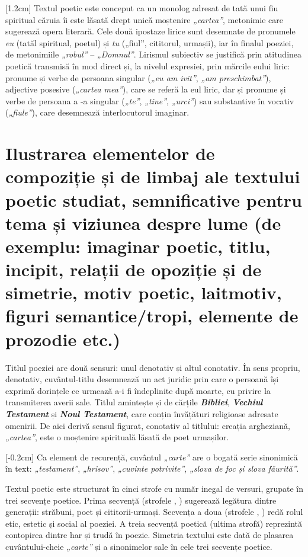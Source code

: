 [1.2cm]
Textul poetic este conceput ca un monolog adresat de tată unui fiu spiritual căruia îi este lăsată drept unică moștenire \textit{„cartea”}, metonimie care sugerează opera literară. Cele două ipostaze lirice sunt desemnate de pronumele \textit{eu} (tatăl spiritual, poetul) și \textit{tu} („fiul”, cititorul, urmașii), iar în finalul poeziei, de metonimiile \textit{„robul”} -- \textit{„Domnul”}. Lirismul subiectiv se justifică prin atitudinea poetică transmisă în mod direct și, la nivelul expresiei, prin mărcile eului liric: pronume și verbe de persoana  singular (\textit{„eu am ivit”}, \textit{„am preschimbat”}), adjective posesive (\textit{„cartea mea”}), care se referă la eul liric, dar și pronume și verbe de persoana a -a singular (\textit{„te”}, \textit{„tine”}, \textit{„urci”}) sau substantive în vocativ (\textit{„fiule”}), care desemnează interlocutorul imaginar.


\section{Ilustrarea elementelor de compoziție și de limbaj ale textului poetic studiat, semnificative pentru tema și viziunea despre lume {\footnotesize\normalfont(de exemplu: imaginar poetic, titlu, incipit, relații de opoziție și de simetrie, motiv poetic, laitmotiv, figuri semantice/tropi, elemente de prozodie etc.)}}

Titlul poeziei are două sensuri: unul denotativ și altul conotativ. În sens propriu, denotativ, cuvântul-titlu desemnează un act juridic prin care o persoană își exprimă dorințele ce urmează a-i fi îndeplinite după moarte, cu privire la transmiterea averii sale. Titlul amintește și de cărțile \textbf{\textit{Bibliei}}, \textbf{\textit{Vechiul Testament}} și \textbf{\textit{Noul Testament}}, care conțin învățături religioase adresate omenirii. De aici derivă sensul figurat, conotativ al titlului: creația argheziană, \textit{„cartea”}, este o moștenire spirituală lăsată de poet urmașilor.

[-0.2cm]
Ca element de recurență, cuvântul \textit{„carte”} are o bogată serie sinonimică în text: \textit{„testament”}, \textit{„hrisov”}, \textit{„cuvinte potrivite”}, \textit{„slova de foc și slova făurită”}.

Textul poetic este structurat în cinci strofe cu număr inegal de versuri, grupate în trei secvențe poetice. Prima secvență (strofele , ) sugerează legătura dintre generații: străbuni, poet și cititorii-urmași. Secvența a doua (strofele , ) redă rolul etic, estetic și social al poeziei. A treia secvență poetică (ultima strofă) reprezintă contopirea dintre har și trudă în poezie. Simetria textului este dată de plasarea cuvântului-cheie \textit{„carte”} și a sinonimelor sale în cele trei secvențe poetice.

